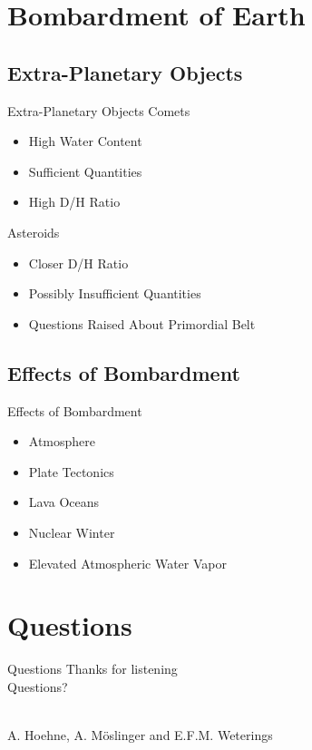 \documentclass[11pt, aspectratio=169]{beamer}
\begin{document}
\section{Bombardment of Earth}
\subsection{Extra-Planetary Objects}
\begin{frame}[t]{Extra-Planetary Objects}
Comets
\begin{itemize}
	\item High Water Content
	\item Sufficient Quantities
	\item High D/H Ratio
\end{itemize}

Asteroids
\begin{itemize}
	\item Closer D/H Ratio
	\item Possibly Insufficient Quantities
	\item Questions Raised About Primordial Belt
\end{itemize}
\end{frame}


\subsection{Effects of Bombardment}
\begin{frame}[t]{Effects of Bombardment}
\begin{itemize}
	\item Atmosphere
	\item Plate Tectonics
	\item Lava Oceans
	\item Nuclear Winter
	\item Elevated Atmospheric Water Vapor
\end{itemize}
	
	
\end{frame}



\section{Questions}
\begin{frame}{Questions}
\centering
\Huge Thanks for listening\\

\huge Questions?\\\

\large A. Hoehne, A. M\"{o}slinger and E.F.M. Weterings\\

\end{frame}
\end{document}
